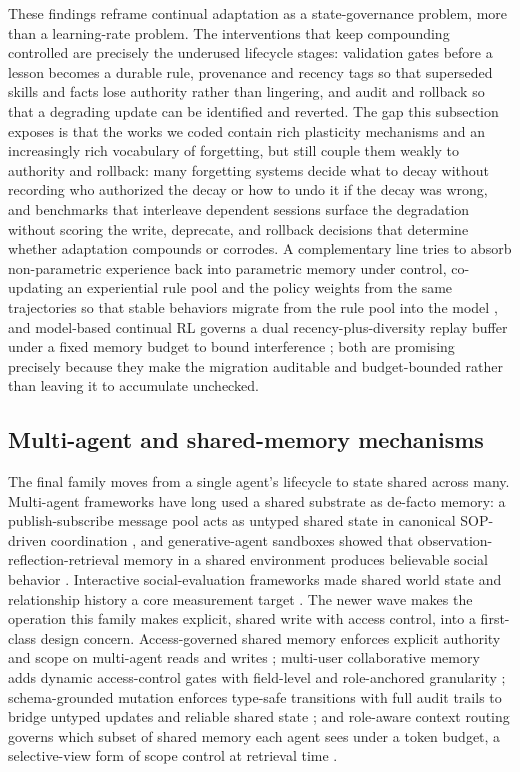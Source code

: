 These findings reframe continual adaptation as a state-governance problem, more than a learning-rate problem. The interventions that keep compounding controlled are precisely the underused lifecycle stages: validation gates before a lesson becomes a durable rule, provenance and recency tags so that superseded skills and facts lose authority rather than lingering, and audit and rollback so that a degrading update can be identified and reverted. The gap this subsection exposes is that the works we coded contain rich plasticity mechanisms and an increasingly rich vocabulary of forgetting, but still couple them weakly to authority and rollback: many forgetting systems decide what to decay without recording who authorized the decay or how to undo it if the decay was wrong, and benchmarks that interleave dependent sessions surface the degradation without scoring the write, deprecate, and rollback decisions that determine whether adaptation compounds or corrodes. A complementary line tries to absorb non-parametric experience back into parametric memory under control, co-updating an experiential rule pool and the policy weights from the same trajectories so that stable behaviors migrate from the rule pool into the model \citep{ye2026jerp}, and model-based continual RL governs a dual recency-plus-diversity replay buffer under a fixed memory budget to bound interference \citep{alyahya2026arrow}; both are promising precisely because they make the migration auditable and budget-bounded rather than leaving it to accumulate unchecked.

\subsection{Multi-agent and shared-memory mechanisms}

The final family moves from a single agent's lifecycle to state shared across many. Multi-agent frameworks have long used a shared substrate as de-facto memory: a publish-subscribe message pool acts as untyped shared state in canonical SOP-driven coordination \citep{hong2023metagpt}, and generative-agent sandboxes showed that observation-reflection-retrieval memory in a shared environment produces believable social behavior \citep{park2023generativeagentsinteractivesimulacra}. Interactive social-evaluation frameworks made shared world state and relationship history a core measurement target \citep{zhou2024sotopiainteractiveevaluationsocial}. The newer wave makes the operation this family makes explicit, shared write with access control, into a first-class design concern. Access-governed shared memory enforces explicit authority and scope on multi-agent reads and writes \citep{margalit2026governedsharedmemorymultiagent}; multi-user collaborative memory adds dynamic access-control gates with field-level and role-anchored granularity \citep{rezazadeh2025collaborativememorymultiusermemory}; schema-grounded mutation enforces type-safe transitions with full audit trails to bridge untyped updates and reliable shared state \citep{zhang2026patchboardschemagroundedstatemutation}; and role-aware context routing governs which subset of shared memory each agent sees under a token budget, a selective-view form of scope control at retrieval time \citep{liu2025rcrrouter}.


